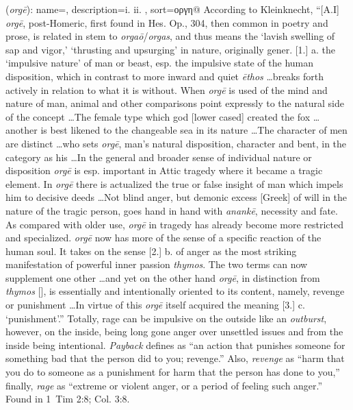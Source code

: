 \item[Rage,]

(\textit{orgē}):
{
    name=,
    description={i.  ii. },
    sort=οργη@
}
According to Kleinknecht, ``[A.I] \emph{orgē}, post-Homeric, first found in Hes. Op., 304, then common in poetry and prose, is related in stem to \emph{orgaō}/\emph{orgas}, and thus means the `lavish swelling of sap and vigor,' `thrusting and upsurging' in nature, originally gener. [1.] a. the `impulsive nature' of man or beast, esp. the impulsive state of the human disposition, which in contrast to more inward and quiet \emph{ēthos} \ldots breaks forth actively in relation to what it is without. When \emph{orgē} is used of the mind and nature of man, animal and other comparisons point expressly to the natural side of the concept \ldots The female type which god [lower cased] created the fox \ldots another is best likened to the changeable sea in its nature \ldots The character of men are distinct \ldots who sets \emph{orgē}, man's natural disposition, character and bent, in the category as his \ldots In the general and broader sense of individual nature or disposition \emph{orgē} is esp. important in Attic tragedy where it became a tragic element. In \emph{orgē} there is actualized the true or false insight of man which impels him to decisive deeds \ldots Not blind anger, but demonic excess [Greek] of will in the nature of the tragic person, goes hand in hand with \emph{anankē}, necessity and fate. As compared with older use, \emph{orgē} in tragedy has already become more restricted and specialized. \emph{orgē} now has more of the sense of a specific reaction of the human soul. It takes on the sense [2.] b. of anger as the most striking manifestation of powerful inner passion \emph{thymos}. The two terms can now supplement one other \ldots and yet on the other hand  \emph{orgē}, in distinction from \emph{thymos} [], is essentially and intentionally oriented to its content, namely, revenge or punishment \ldots In virtue of this \emph{orgē} itself acquired the meaning [3.] c. `punishment'.'' 
Totally, rage can be impulsive on the outside like an \emph{outburst}, however, on the inside, being long gone anger over unsettled issues and from the inside being intentional. \emph{Payback} defines as ``an action that punishes someone for something bad that the person did to you; revenge.'' Also, \emph{revenge} as ``harm that you do to someone as a punishment for harm that the person has done to you,'' finally, \emph{rage} as ``extreme or violent anger, or a period of feeling such anger.''
Found in 1~Tim 2:8; Col. 3:8.
